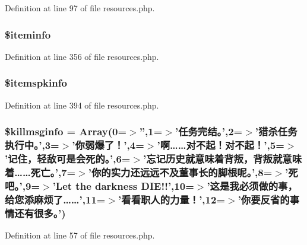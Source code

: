 Definition at line 97 of file resources.\+php.

\hypertarget{resources_8php_abf61f517048be2c7cc3d9c24e62f1160}{
\subsubsection[{\$iteminfo}]{\setlength{\rightskip}{0pt plus 5cm}\$iteminfo}}\label{resources_8php_abf61f517048be2c7cc3d9c24e62f1160}


Definition at line 356 of file resources.\+php.

\hypertarget{resources_8php_af5da654ca4941efa7e59e9608ad80106}{
\subsubsection[{\$itemspkinfo}]{\setlength{\rightskip}{0pt plus 5cm}\$itemspkinfo}}\label{resources_8php_af5da654ca4941efa7e59e9608ad80106}


Definition at line 394 of file resources.\+php.

\hypertarget{resources_8php_acfdab9efcdacf2869477a5e833712b40}{
\subsubsection[{\$killmsginfo}]{\setlength{\rightskip}{0pt plus 5cm}\$killmsginfo = Array(0=$>$'',1=$>$'任务完结。',2=$>$'猎杀任务执行中。',3=$>$'你弱爆了！',4=$>$'啊……对不起！对不起！',5=$>$'记住，轻敌可是会死的。',6=$>$'忘记历史就意味着背叛，背叛就意味着……死亡。',7=$>$'你的实力还远远不及董事长的脚根呢。',8=$>$'死吧。',9=$>$'Let the darkness D\+I\+E!!',10=$>$'这是我必须做的事，给您添麻烦了……',11=$>$'看看职人的力量！',12=$>$'你要反省的事情还有很多。')}}\label{resources_8php_acfdab9efcdacf2869477a5e833712b40}


Definition at line 57 of file resources.\+php.

